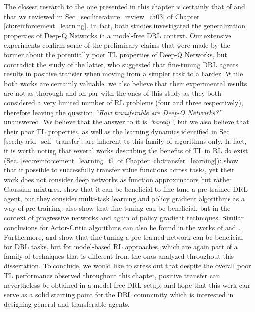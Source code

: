 The closest research to the one presented in this chapter is certainly that of \citet{farebrother2018generalization} and \citet{tyo2020transferable} that we reviewed in Sec. \ref{sec:literature_review_ch03} of Chapter \ref{ch:reinforcement_learning}. In fact, both studies investigated the generalization properties of Deep-Q Networks in a model-free DRL context. Our extensive experiments confirm some of the preliminary claims that were made by the former about the potentially poor TL properties of Deep-Q Networks, but contradict the study of the latter, who suggested that fine-tuning DRL agents results in positive transfer when moving from a simpler task to a harder. While both works are certainly valuable, we also believe that their experimental results are not as thorough and on par with the ones of this study as they both considered a very limited number of RL problems (four and three respectively), therefore leaving the question \textit{``How transferable are Deep-Q Networks?''} unanswered. We believe that the answer to it is \textit{``barely''}, but we also believe that their poor TL properties, as well as the learning dynamics identified in Sec. \ref{sec:hybrid_self_transfer}, are inherent to this family of algorithms only. In fact, it is worth noting that several works describing the benefits of TL in RL do exist (Sec. \ref{sec:reinforcement_learning_tl} of Chapter \ref{ch:transfer_learning}): \citet{tirinzoni2018transfer} show that it possible to successfully transfer value functions across tasks, yet their work does not consider deep networks as function approximators but rather Gaussian mixtures. \citet{parisotto2015actor} show that it can be beneficial to fine-tune a pre-trained DRL agent, but they consider multi-task learning and policy gradient algorithms as a way of pre-training. \citet{rusu2016progressive} also show that fine-tuning can be beneficial, but in the context of progressive networks and again of policy gradient techniques. Similar conclusions for Actor-Critic algorithms can also be found in the works of \citet{zhu2017target} and \citet{chen2021improving}. Furthermore, \citet{landolfi2019model} and \citet{sasso2021fractional} show that fine-tuning a pre-trained network can be beneficial for DRL tasks, but for model-based RL approaches, which are again part of a family of techniques that is different from the ones analyzed throughout this dissertation. To conclude, we would like to stress out that despite the overall poor TL performance observed throughout this chapter, positive transfer can nevertheless be obtained in a model-free DRL setup, and hope that this work can serve as a solid starting point for the DRL community which is interested in designing general and transferable agents.  








